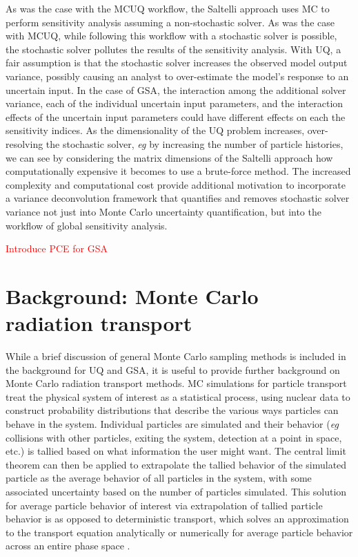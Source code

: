 As was the case with the MCUQ workflow, the Saltelli approach uses MC to perform sensitivity analysis assuming a non-stochastic solver. As was the case with MCUQ, while following this workflow with a stochastic solver is possible, the stochastic solver pollutes the results of the sensitivity analysis. With UQ, a fair assumption is that the stochastic solver increases the observed model output variance, possibly causing an analyst to over-estimate the model's response to an uncertain input. In the case of GSA, the interaction among the additional solver variance, each of the individual uncertain input parameters, and the interaction effects of the uncertain input parameters could have different effects on each the sensitivity indices. As the dimensionality of the UQ problem increases, over-resolving the stochastic solver, \textit{eg} by increasing the number of particle histories, we can see by considering the matrix dimensions of the Saltelli approach how computationally expensive it becomes to use a brute-force method. The increased complexity and computational cost provide additional motivation to incorporate a variance deconvolution framework that quantifies and removes stochastic solver variance not just into Monte Carlo uncertainty quantification, but into the workflow of global sensitivity analysis.

\textcolor{red}{Introduce PCE for GSA}

\section{Background: Monte Carlo radiation transport}\label{sec:background-mcrt}
While a brief discussion of general Monte Carlo sampling methods is included in the background for UQ and GSA, it is useful to provide further background on Monte Carlo radiation transport methods. MC simulations for particle transport treat the physical system of interest as a statistical process, using nuclear data to construct probability distributions that describe the various ways particles can behave in the system. Individual particles are simulated and their behavior (\textit{eg} collisions with other particles, exiting the system, detection at a point in space, etc.) is tallied based on what information the user might want. The central limit theorem can then be applied to extrapolate the tallied behavior of the simulated particle as the average behavior of all particles in the system, with some associated uncertainty based on the number of particles simulated. This solution for average particle behavior of interest via extrapolation of tallied particle behavior is as opposed to deterministic transport, which solves an approximation to the transport equation analytically or numerically for average particle behavior across an entire phase space \cite{mcnp}. 

